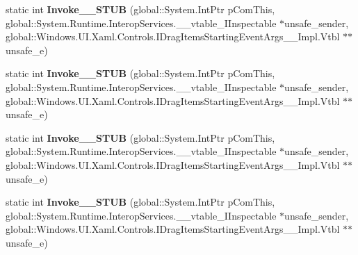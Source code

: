 \begin{DoxyCompactItemize}
\item 
\mbox{\label{struct_windows_1_1_u_i_1_1_xaml_1_1_controls_1_1_drag_items_starting_event_handler_____impl_1_1_vtbl_ac26db477564b8cde386e32339bb31cb8}} 
static int {\bfseries Invoke\+\_\+\+\_\+\+S\+T\+UB} (global\+::\+System.\+Int\+Ptr p\+Com\+This, global\+::\+System.\+Runtime.\+Interop\+Services.\+\_\+\+\_\+vtable\+\_\+\+I\+Inspectable $\ast$unsafe\+\_\+sender, global\+::\+Windows.\+U\+I.\+Xaml.\+Controls.\+I\+Drag\+Items\+Starting\+Event\+Args\+\_\+\+\_\+\+Impl.\+Vtbl $\ast$$\ast$unsafe\+\_\+e)
\item 
\mbox{\label{struct_windows_1_1_u_i_1_1_xaml_1_1_controls_1_1_drag_items_starting_event_handler_____impl_1_1_vtbl_ac26db477564b8cde386e32339bb31cb8}} 
static int {\bfseries Invoke\+\_\+\+\_\+\+S\+T\+UB} (global\+::\+System.\+Int\+Ptr p\+Com\+This, global\+::\+System.\+Runtime.\+Interop\+Services.\+\_\+\+\_\+vtable\+\_\+\+I\+Inspectable $\ast$unsafe\+\_\+sender, global\+::\+Windows.\+U\+I.\+Xaml.\+Controls.\+I\+Drag\+Items\+Starting\+Event\+Args\+\_\+\+\_\+\+Impl.\+Vtbl $\ast$$\ast$unsafe\+\_\+e)
\item 
\mbox{\label{struct_windows_1_1_u_i_1_1_xaml_1_1_controls_1_1_drag_items_starting_event_handler_____impl_1_1_vtbl_ac26db477564b8cde386e32339bb31cb8}} 
static int {\bfseries Invoke\+\_\+\+\_\+\+S\+T\+UB} (global\+::\+System.\+Int\+Ptr p\+Com\+This, global\+::\+System.\+Runtime.\+Interop\+Services.\+\_\+\+\_\+vtable\+\_\+\+I\+Inspectable $\ast$unsafe\+\_\+sender, global\+::\+Windows.\+U\+I.\+Xaml.\+Controls.\+I\+Drag\+Items\+Starting\+Event\+Args\+\_\+\+\_\+\+Impl.\+Vtbl $\ast$$\ast$unsafe\+\_\+e)
\item 
\mbox{\label{struct_windows_1_1_u_i_1_1_xaml_1_1_controls_1_1_drag_items_starting_event_handler_____impl_1_1_vtbl_ac26db477564b8cde386e32339bb31cb8}} 
static int {\bfseries Invoke\+\_\+\+\_\+\+S\+T\+UB} (global\+::\+System.\+Int\+Ptr p\+Com\+This, global\+::\+System.\+Runtime.\+Interop\+Services.\+\_\+\+\_\+vtable\+\_\+\+I\+Inspectable $\ast$unsafe\+\_\+sender, global\+::\+Windows.\+U\+I.\+Xaml.\+Controls.\+I\+Drag\+Items\+Starting\+Event\+Args\+\_\+\+\_\+\+Impl.\+Vtbl $\ast$$\ast$unsafe\+\_\+e)

\end{DoxyCompactItemize}
